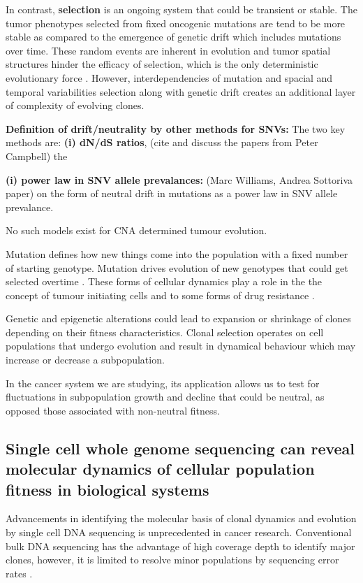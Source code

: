 In contrast, \textbf{selection} is an ongoing system that could be transient or stable. The tumor phenotypes selected from fixed oncogenic mutations \cite{sidransky1992clonal,j2010mutator} are tend to be more stable as compared to the emergence of genetic drift which includes mutations over time. These random events are inherent in evolution and tumor spatial structures hinder the efficacy of selection, which is the only deterministic evolutionary force \cite{szendro2013predictability}.
However, interdependencies of mutation and spacial and temporal variabilities selection along with genetic drift creates an additional layer of complexity of evolving clones.

\textbf{Definition of drift/neutrality by other methods for SNVs: } 
The two key methods are:
\textbf{(i) dN/dS ratios}, (cite and discuss the papers from Peter Campbell) the 

\textbf{(i) power law in SNV allele prevalances:}
(Marc Williams, Andrea Sottoriva paper) on the form of neutral drift in mutations as a power law in SNV allele prevalance.

No such models exist for CNA determined tumour evolution.


Mutation defines how new things come into the population with a fixed number of starting genotype. Mutation drives evolution of new genotypes that could get selected overtime \cite{jain2007deterministic,gerrish1998fate}. These forms of cellular dynamics play a role in the the concept of tumour initiating cells \cite{magee2012cancer} and to some forms of drug resistance \cite{shaffer2017rare, kreso2013variable}. 


 Genetic and epigenetic alterations could lead to expansion or shrinkage of clones depending on their fitness characteristics. Clonal selection operates on cell populations that undergo evolution and result in dynamical behaviour which may increase or decrease a subpopulation.

In the cancer system we are studying, its application allows us to test for fluctuations in subpopulation growth and decline that could be neutral, as opposed those associated with non-neutral fitness. 


\subsection{Single cell whole genome sequencing can reveal molecular dynamics of cellular population fitness in biological systems}
Advancements in identifying the molecular basis of clonal dynamics and evolution by single cell DNA sequencing is unprecedented in cancer research. Conventional bulk DNA sequencing has the advantage of high coverage depth to identify major clones, however, it is limited to resolve minor populations by sequencing error rates \cite{gerstung2012reliable}. 

